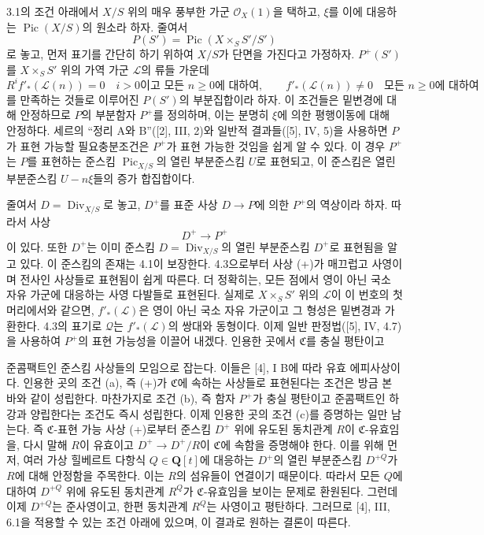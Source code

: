 3.1의 조건 아래에서 $X/S$ 위의 매우 풍부한 가군
$\mathcal O_X(1)$을 택하고, $\xi$를 이에 대응하는
$\operatorname{Pic}(X/S)$의 원소라 하자. 줄여서
\[
P(S')=\operatorname{Pic}(X\times_SS'/S')
\]
로 놓고, 먼저 표기를 간단히 하기 위하여 $X/S$가 단면을 가진다고
가정하자. $P^+(S')$를 $X\times_SS'$ 위의 가역 가군 $\mathcal L$의
류들 가운데
\[
R^if'_*(\mathcal L(n))=0\quad\text{$i>0$이고 모든 $n\geq0$에 대하여},
\qquad
f'_*(\mathcal L(n))\neq0\quad\text{모든 $n\geq0$에 대하여}
\]
를 만족하는 것들로 이루어진 $P(S')$의 부분집합이라 하자. 이 조건들은
밑변경에 대해 안정하므로 $P$의 부분함자 $P^+$를 정의하며, 이는 분명히
$\xi$에 의한 평행이동에 대해 안정하다. 세르의 “정리 A와 B”([2], III,
2)와 일반적 결과들([5], IV, 5)을 사용하면 $P$가 표현 가능할
필요충분조건은 $P^+$가 표현 가능한 것임을 쉽게 알 수 있다. 이 경우
$P^+$는 $P$를 표현하는 준스킴 $\operatorname{Pic}_{X/S}$의 열린
부분준스킴 $U$로 표현되고, 이 준스킴은 열린 부분준스킴 $U-n\xi$들의
증가 합집합이다.

줄여서 $D=\operatorname{Div}_{X/S}$로 놓고, $D^+$를 표준 사상
$D\longrightarrow P$에 의한 $P^+$의 역상이라 하자. 따라서 사상
\begin{equation}
D^+\longrightarrow P^+
\tag{+}
\end{equation}
이 있다. 또한 $D^+$는 이미 준스킴 $D=\operatorname{Div}_{X/S}$의
열린 부분준스킴 $D^+$로 표현됨을 알고 있다. 이 준스킴의 존재는 4.1이
보장한다. 4.3으로부터 사상 (+)가 매끄럽고 사영이며 전사인 사상들로
표현됨이 쉽게 따른다. 더 정확히는, 모든 점에서 영이 아닌 국소 자유
가군에 대응하는 사영 다발들로 표현된다. 실제로
$X\times_SS'$ 위의 $\mathcal L$이 이 번호의 첫머리에서와 같으면,
$f'_*(\mathcal L)$은 영이 아닌 국소 자유 가군이고 그 형성은 밑변경과
가환한다. 4.3의 표기로 $\mathcal Q$는 $f'_*(\mathcal L)$의 쌍대와
동형이다. 이제 일반 판정법([5], IV, 4.7)을 사용하여 $P^+$의 표현
가능성을 이끌어 내겠다. 인용한 곳에서 $\mathfrak C$를 충실 평탄이고

준콤팩트인 준스킴 사상들의 모임으로 잡는다. 이들은 [4], I B에 따라
유효 에피사상이다. 인용한 곳의 조건 (a), 즉 (+)가
$\mathfrak C$에 속하는 사상들로 표현된다는 조건은 방금 본 바와 같이
성립한다. 마찬가지로 조건 (b), 즉 함자 $P^+$가 충실 평탄이고
준콤팩트인 하강과 양립한다는 조건도 즉시 성립한다. 이제 인용한 곳의
조건 (c)를 증명하는 일만 남는다. 즉 $\mathfrak C$-표현 가능 사상
(+)로부터 준스킴 $D^+$ 위에 유도된 동치관계 $R$이
$\mathfrak C$-유효임을, 다시 말해 $R$이 유효이고
$D^+\longrightarrow D^+/R$이 $\mathfrak C$에 속함을 증명해야 한다.
이를 위해 먼저, 여러 가상 힐베르트 다항식 $Q\in\mathbf Q[t]$에 대응하는
$D^+$의 열린 부분준스킴 $D^{+Q}$가 $R$에 대해 안정함을 주목한다.
이는 $R$의 섬유들이 연결이기 때문이다. 따라서 모든 $Q$에 대하여
$D^{+Q}$ 위에 유도된 동치관계 $R^Q$가 $\mathfrak C$-유효임을 보이는
문제로 환원된다. 그런데 이제 $D^{+Q}$는 준사영이고, 한편 동치관계
$R^Q$는 사영이고 평탄하다. 그러므로 [4], III, 6.1을 적용할 수 있는
조건 아래에 있으며, 이 결과로 원하는 결론이 따른다.

